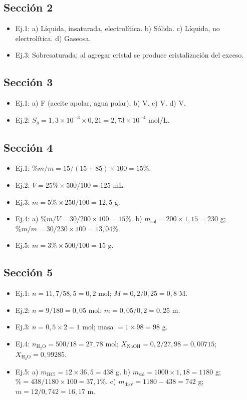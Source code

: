 \documentclass[11pt,a4paper]{article}
\begin{document}
\subsection*{Sección 2}
\begin{itemize}[nosep]
  \item Ej.1: a) Líquida, insaturada, electrolítica. b) Sólida. c) Líquida, no electrolítica. d) Gaseosa.
  \item Ej.3: Sobresaturada; al agregar cristal se produce cristalización del exceso.
\end{itemize}

\subsection*{Sección 3}
\begin{itemize}[nosep]
  \item Ej.1: a) F (aceite apolar, agua polar). b) V. c) V. d) V.
  \item Ej.2: $S_g = 1{,}3 \times 10^{-3} \times 0{,}21 = 2{,}73 \times 10^{-4}$ mol/L.
\end{itemize}

\subsection*{Sección 4}
\begin{itemize}[nosep]
  \item Ej.1: $\% m/m = 15/(15+85) \times 100 = 15\%$.
  \item Ej.2: $V = 25\% \times 500/100 = 125$ mL.
  \item Ej.3: $m = 5\% \times 250/100 = 12{,}5$ g.
  \item Ej.4: a) $\% m/V = 30/200 \times 100 = 15\%$. b) $m_{\text{sol}} = 200 \times 1{,}15 = 230$ g; $\% m/m = 30/230 \times 100 = 13{,}04\%$.
  \item Ej.5: $m = 3\% \times 500/100 = 15$ g.
\end{itemize}

\subsection*{Sección 5}
\begin{itemize}[nosep]
  \item Ej.1: $n = 11{,}7/58{,}5 = 0{,}2$ mol; $M = 0{,}2/0{,}25 = 0{,}8$ M.
  \item Ej.2: $n = 9/180 = 0{,}05$ mol; $m = 0{,}05/0{,}2 = 0{,}25$ m.
  \item Ej.3: $n = 0{,}5 \times 2 = 1$ mol; masa $= 1 \times 98 = 98$ g.
  \item Ej.4: $n_{\text{H}_2\text{O}} = 500/18 = 27{,}78$ mol; $X_{\text{NaOH}} = 0{,}2/27{,}98 = 0{,}00715$; $X_{\text{H}_2\text{O}} = 0{,}99285$.
  \item Ej.5: a) $m_{\text{HCl}} = 12 \times 36{,}5 = 438$ g. b) $m_{\text{sol}} = 1000 \times 1{,}18 = 1180$ g; $\% = 438/1180 \times 100 = 37{,}1\%$. c) $m_{\text{disv}} = 1180 - 438 = 742$ g; $m = 12/0{,}742 = 16{,}17$ m.
\end{itemize}
\end{document}
